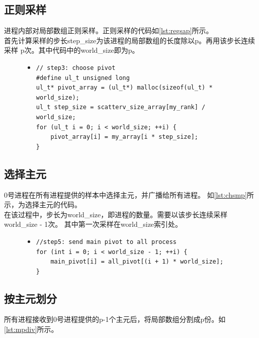 \documentclass[a4paper]{article}
\begin{document}
\subsection{正则采样}
进程内部对局部数组正则采样。正则采样的代码如\autoref{lst:regsap}所示。\\

首先计算采样的步长step\_size为该进程的局部数组的长度除以p。再用该步长连续采样
p次。其中代码中的world\_size即为p。
\begin{figure}[!hbt]
\begin{itemize}
\item[] \begin{lstlisting}[style=mycpp, label=lst:regsap, caption=正则采样重要代码展示]
// step3: choose pivot
#define ul_t unsigned long
ul_t* pivot_array = (ul_t*) malloc(sizeof(ul_t) * world_size);
ul_t step_size = scatterv_size_array[my_rank] / world_size;
for (ul_t i = 0; i < world_size; ++i) {
    pivot_array[i] = my_array[i * step_size];
}
\end{lstlisting}
\end{itemize}
\end{figure}


\subsection{选择主元}
0号进程在所有进程提供的样本中选择主元，并广播给所有进程。
如\autoref{lst:chsmp}所示，为选择主元的代码。\\

在该过程中，步长为world\_size，即进程的数量。需要以该步长连续采样world\_size - 1次。
其中第一次采样在world\_size索引处。
\begin{figure}[!hbt]
\begin{itemize}
\item[] \begin{lstlisting}[style=mycpp, label=lst:chsmp, caption=选择主元重要代码]
//step5: send main pivot to all process
for (int i = 0; i < world_size - 1; ++i) {
    main_pivot[i] = all_pivot[(i + 1) * world_size];
}
\end{lstlisting}
\end{itemize}
\end{figure}

\subsection{按主元划分}\label{subsec:codempdiv}
所有进程接收到0号进程提供的p-1个主元后，将局部数组分割成p份。如\autoref{lst:mpdiv}所示。\\
\end{document}
